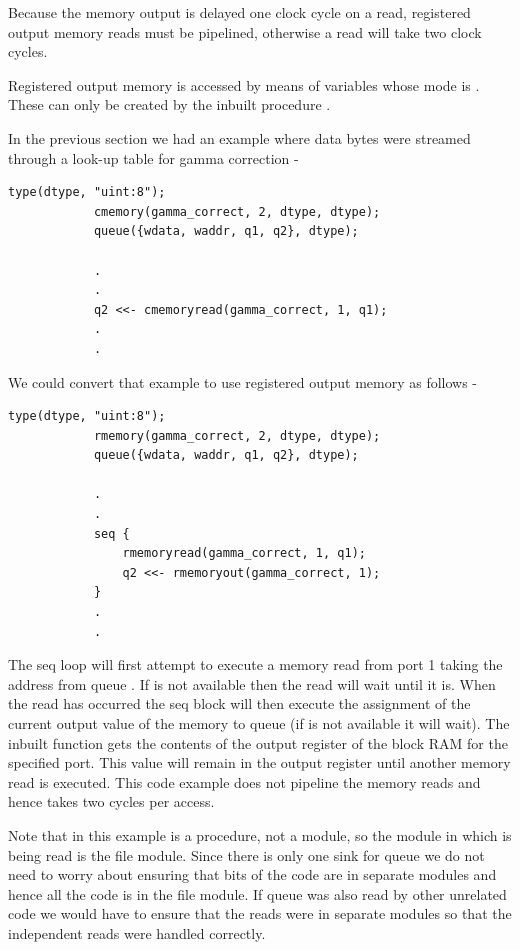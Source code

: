         Because the memory output is delayed one clock cycle on a read, registered
        output memory reads must be pipelined, otherwise a read will take two clock
        cycles.

        Registered output memory is accessed by means of variables whose mode
        is . These can only be created by the inbuilt procedure
        .

        In the previous section we had an example where data bytes were streamed
        through a look-up table for gamma correction -
        \begin{lstlisting}[language=threepl]
            type(dtype, "uint:8");
            cmemory(gamma_correct, 2, dtype, dtype);
            queue({wdata, waddr, q1, q2}, dtype);

            .
            .
            q2 <<- cmemoryread(gamma_correct, 1, q1);
            .
            .
        \end{lstlisting}
        We could convert that example to use registered output memory as follows -
        \begin{lstlisting}[language=threepl]
            type(dtype, "uint:8");
            rmemory(gamma_correct, 2, dtype, dtype);
            queue({wdata, waddr, q1, q2}, dtype);

            .
            .
            seq {
                rmemoryread(gamma_correct, 1, q1);
                q2 <<- rmemoryout(gamma_correct, 1);
            }
            .
            .
        \end{lstlisting}
        The seq loop will first attempt to execute a memory read from port 1 taking
        the address from queue . If  is not available then the read
        will wait until it is. When the read has occurred the seq block will then
        execute the assignment of the current output value of the memory to queue
         (if  is not available it will wait). The inbuilt function
         gets the contents of the output register of the block RAM
        for the specified port. This value will remain in the output register until
        another memory read is executed. This code example does not pipeline the
        memory reads and hence takes two cycles per access.

        Note that in this example  is a procedure, not a module,
        so the module in which  is being read is the file module.
        Since there is only one sink for queue  we do not need to worry
        about ensuring that bits of the code are in separate modules and hence
        all the code is in the file module. If queue  was also
        read by other unrelated code we would have to ensure that the reads were
        in separate modules so that the independent reads were handled correctly.

